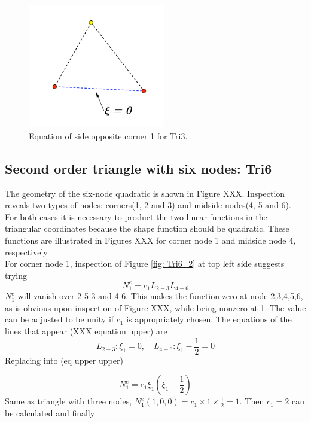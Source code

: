 \documentclass{article}
\begin{document}
\begin{figure}[h]
	\begin{center}
		\includegraphics[width=6cm,clip]{Tri3_2.pdf}			
		\caption{Equation of side opposite corner 1 for Tri3.} \label{fig: Tri3_2}
	\end{center} 
\end{figure}

\subsection{Second order triangle with six nodes: Tri6}
The geometry of the six-node quadratic is shown in Figure XXX. Inspection reveals two types of nodes: corners(1, 2 and 3) and midside nodes(4, 5 and 6). For both cases it is necessary to product the two linear functions in the triangular coordinates because the shape function should be quadratic. These functions are illustrated in Figures XXX for corner node 1 and midside node 4, respectively. \\
For corner node 1, inspection of Figure \ref{fig: Tri6_2} at top left side suggests trying
\begin{equation}
N_1^e = c_1L_{2-3}L_{4-6}
\end{equation}
$N_1^e$ will vanish over 2-5-3 and 4-6. This makes the function zero at node 2,3,4,5,6, as is obvious upon inspection of Figure XXX, while being nonzero at 1. The value can be adjusted to be unity if $c_1$ is appropriately chosen. The equations of the lines that appear (XXX equation upper) are
\begin{equation}
L_{2-3}: \xi_1 = 0, \quad L_{4-6}: \xi_1 - \frac{1}{2} = 0
\end{equation}
Replacing into (eq upper upper)

\begin{equation}
N_1^e = c_1\xi_1 \left(\xi_1 - \frac{1}{2}\right)
\end{equation}
Same as triangle with three nodes, $N_1^e\left(1,0,0\right) = c_1 \times 1 \times \frac{1}{2} = 1$. Then $c_1 = 2$ can be calculated and finally 
\end{document}
